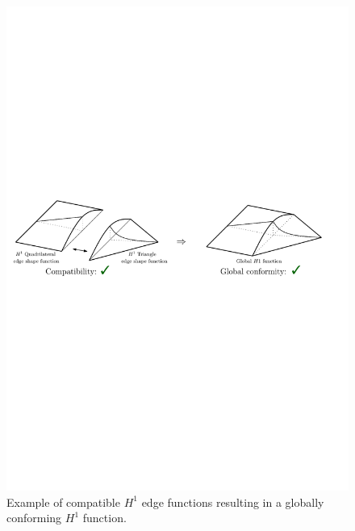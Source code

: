 \begin{figure}[!ht]
\begin{center}
\includegraphics[scale=0.7]{./figures/CompatibilityDefinition.pdf}
\caption{Example of compatible $H^1$ edge functions resulting in a globally conforming $H^1$ function.}
\label{fig:compatibilitydefinition}
\end{center}
\end{figure}


